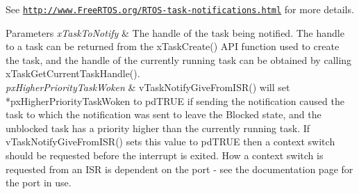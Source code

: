 \begin{DoxyPre}See \href{http://www.FreeRTOS.org/RTOS-task-notifications.html}{\tt http://www.FreeRTOS.org/RTOS-task-notifications.html} for more details.\end{DoxyPre}



\begin{DoxyPre}
\begin{DoxyParams}{Parameters}
{\em xTaskToNotify} & The handle of the task being notified.  The handle to a
task can be returned from the xTaskCreate() API function used to create the
task, and the handle of the currently running task can be obtained by calling
xTaskGetCurrentTaskHandle().\\
\hline
{\em pxHigherPriorityTaskWoken} & vTaskNotifyGiveFromISR() will set
*pxHigherPriorityTaskWoken to pdTRUE if sending the notification caused the
task to which the notification was sent to leave the Blocked state, and the
unblocked task has a priority higher than the currently running task.  If
vTaskNotifyGiveFromISR() sets this value to pdTRUE then a context switch
should be requested before the interrupt is exited.  How a context switch is
requested from an ISR is dependent on the port - see the documentation page
for the port in use.
\\
\hline
\end{DoxyParams}
\end{DoxyPre}
